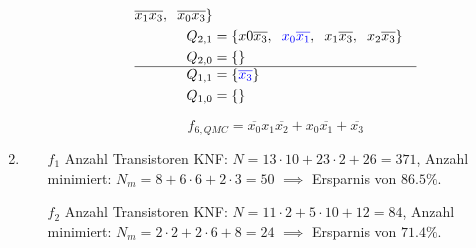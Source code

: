 \documentclass[a4paper]{article}
\begin{document}
\begin{enumerate}[label=\alph*)]
\begin{enumerate}[label=\roman*)]
\begin{align*}
			\overline{x_1x_3},\hspace{0.2cm}
			\overline{x_0x_3}
			\}\\
			Q_{2,1} &= \{
			x0\overline{x_3},\hspace{0.2cm}
			\textcolor{blue}{x_0\overline{x_1}},\hspace{0.2cm}
			x_1\overline{x_3},\hspace{0.2cm}
			x_2\overline{x_3}
			\}\\
			Q_{2,0} &= \{ \}\\
			\hline
			Q_{1,1} &= \{\textcolor{blue}{\overline{x_3}} \}\\
			Q_{1,0} &= \{\}\\
		\end{align*}
		
		\begin{equation*}
		f_{6, QMC} = \overline{x_0}x_1\overline{x_2} + x_0\overline{x_1} + \overline{x_3}
		\end{equation*}
	\end{enumerate}

    \item \begin{itemize}
        \item[$f_1$] Anzahl Transistoren KNF: $N=13\cdot10 + 23\cdot2 + 26 = 371$, Anzahl minimiert: $N_m=8+6\cdot6+2\cdot3 = 50$ $\implies$ Ersparnis von $86.5\%$.
        \item[$f_2$] Anzahl Transistoren KNF: $N=11\cdot2+5\cdot10+12=84$, Anzahl minimiert: $N_m=2\cdot2+2\cdot6+8=24$ $\implies$ Ersparnis von $71.4\%$.
    \end{itemize}
\end{enumerate}
\end{document}
